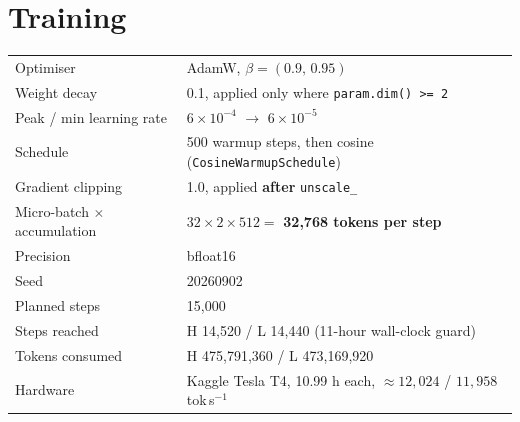 \documentclass[11pt]{report}
\begin{document}
\section{Training}

\begin{center}\small
\begin{tabular}{ll}
\toprule
Optimiser & AdamW, $\beta = (0.9,\,0.95)$ \\
Weight decay & 0.1, applied only where \texttt{param.dim() >= 2} \\
Peak / min learning rate & $6\times10^{-4}$ $\rightarrow$ $6\times10^{-5}$ \\
Schedule & 500 warmup steps, then cosine (\texttt{CosineWarmupSchedule}) \\
Gradient clipping & 1.0, applied \textbf{after} \texttt{unscale\_} \\
Micro-batch $\times$ accumulation & $32 \times 2 \times 512 = $ \textbf{32,768 tokens per step} \\
Precision & bfloat16 \\
Seed & 20260902 \\
Planned steps & 15,000 \\
Steps reached & H 14,520 / L 14,440 (11-hour wall-clock guard) \\
Tokens consumed & H 475,791,360 / L 473,169,920 \\
Hardware & Kaggle Tesla T4, 10.99 h each, ${\approx}12{,}024$ / $11{,}958$ tok\,s$^{-1}$ \\
\bottomrule
\end{tabular}
\end{center}
\end{document}

